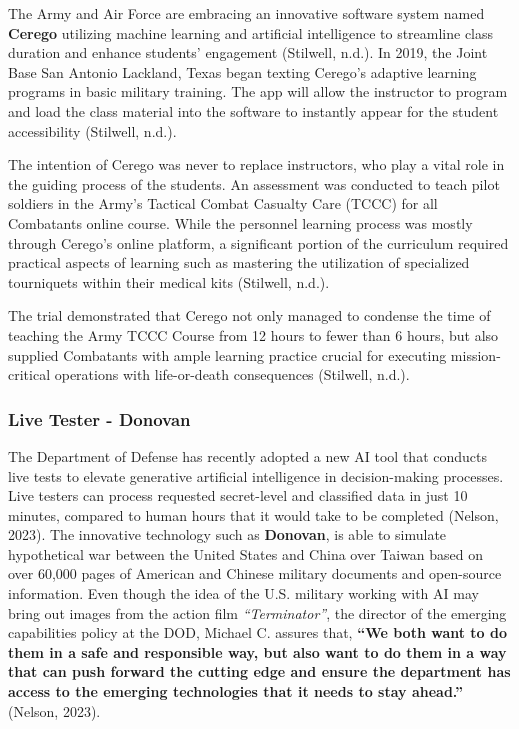 \documentclass[
]{article}
\begin{document}
The Army and Air Force are embracing an innovative software system named \textbf{Cerego} utilizing machine learning and artificial intelligence to streamline class duration and enhance students' engagement (Stilwell, n.d.). In 2019, the Joint Base San Antonio Lackland, Texas began texting Cerego's adaptive learning programs in basic military training. The app will allow the instructor to program and load the class material into the software to instantly appear for the student accessibility (Stilwell, n.d.).

The intention of Cerego was never to replace instructors, who play a vital role in the guiding process of the students. An assessment was conducted to teach pilot soldiers in the Army's Tactical Combat Casualty Care (TCCC) for all Combatants online course. While the personnel learning process was mostly through Cerego's online platform, a significant portion of the curriculum required practical aspects of learning such as mastering the utilization of specialized tourniquets within their medical kits (Stilwell, n.d.).

The trial demonstrated that Cerego not only managed to condense the time of teaching the Army TCCC Course from 12 hours to fewer than 6 hours, but also supplied Combatants with ample learning practice crucial for executing mission-critical operations with life-or-death consequences (Stilwell, n.d.).

\hypertarget{live-tester---donovan}{%
\subsubsection{Live Tester - Donovan}\label{live-tester---donovan}}

The Department of Defense has recently adopted a new AI tool that conducts live tests to elevate generative artificial intelligence in decision-making processes. Live testers can process requested secret-level and classified data in just 10 minutes, compared to human hours that it would take to be completed (Nelson, 2023).
The innovative technology such as \textbf{Donovan}, is able to simulate hypothetical war between the United States and China over Taiwan based on over 60,000 pages of American and Chinese military documents and open-source information. Even though the idea of the U.S. military working with AI may bring out images from the action film \emph{``Terminator''}, the director of the emerging capabilities policy at the DOD, Michael C. assures that, \textbf{``We both want to do them in a safe and responsible way, but also want to do them in a way that can push forward the cutting edge and ensure the department has access to the emerging technologies that it needs to stay ahead.''} (Nelson, 2023).
\end{document}
